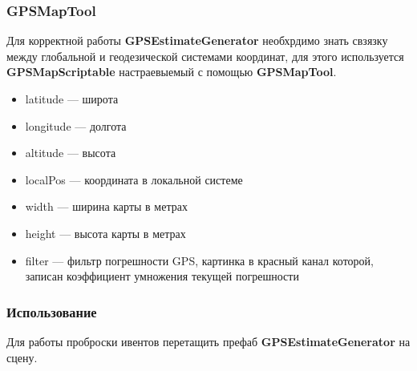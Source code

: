 \documentclass[a4paper, 11pt, titlepage]{article}
\begin{document}
      \subsubsection{GPSMapTool}
        Для корректной работы \textbf{GPSEstimateGenerator} необхрдимо знать свзязку между глобальной и геодезической системами координат, для 
        этого используется \textbf{GPSMapScriptable} настраевыемый с помощью \textbf{GPSMapTool}.  
        \begin{center}
        \end{center}
        \begin{itemize}
          \item latitude --- широта
          \item longitude --- долгота
          \item altitude --- высота
          \item localPos --- координата в локальной системе
          \item width --- ширина карты в метрах
          \item height --- высота карты в метрах
          \item filter --- фильтр погрешности GPS, картинка в красный канал которой, записан коэффициент умножения текущей погрешности
        \end{itemize}
      \subsubsection{Использование}
        Для работы проброски ивентов перетащить префаб \textbf{GPSEstimateGenerator} на сцену.
\end{document}
